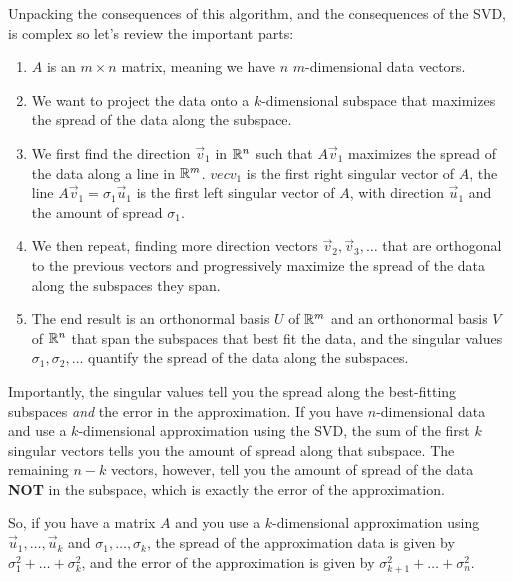 \documentclass{ximera}
\begin{document}
\begin{remark}
  Unpacking the consequences of this algorithm, and the consequences of the SVD, is complex so let's review the important parts:
  \begin{enumerate}
    \item $A$ is an $m\times n$ matrix, meaning we have $n$ $m$-dimensional data vectors. 
    \item We want to project the data onto a $k$-dimensional subspace that maximizes the spread of the data along the subspace.
    \item We first find the direction $\vec{v}_1$ in $\mathbb{R}^n$ such that $A\vec{v}_1$ maximizes the spread of the data along a line in $\mathbb{R}^m$. $vec{v}_1$ is the first right singular vector of $A$, the line $A\vec{v}_1=\sigma_1\vec{u}_1$ is the first left singular vector of $A$, with direction $\vec{u}_1$ and the amount of spread $\sigma_1$.
    \item We then repeat, finding more direction vectors $\vec{v}_2,\vec{v}_3,\ldots$ that are orthogonal to the previous vectors and progressively maximize the spread of the data along the subspaces they span.
    \item The end result is an orthonormal basis $U$ of $\mathbb{R}^m$ and an orthonormal basis $V$ of $\mathbb{R}^n$ that span the subspaces that best fit the data, and the singular values $\sigma_1,\sigma_2,\ldots$ quantify the spread of the data along the subspaces.

  \end{enumerate}
\end{remark}

\begin{remark}

  Importantly, the singular values tell you the spread along the best-fitting subspaces \emph{and} the error in the approximation. If you have $n$-dimensional data and use a $k$-dimensional approximation using the SVD, the sum of the first $k$ singular vectors tells you the amount of spread along that subspace. The remaining $n-k$ vectors, however, tell you the amount of spread of the data {\bf NOT} in the subspace, which is exactly the error of the approximation.

  So, if you have a matrix $A$ and you use a $k$-dimensional approximation using $\vec{u}_1,\ldots,\vec{u}_k$ and $\sigma_1,\ldots,\sigma_k$, the spread of the approximation data is given by $\sigma_1^2+\ldots+\sigma_k^2$, and the error of the approximation is given by $\sigma_{k+1}^2+\ldots+\sigma_n^2$.
\end{remark}
\end{document}
